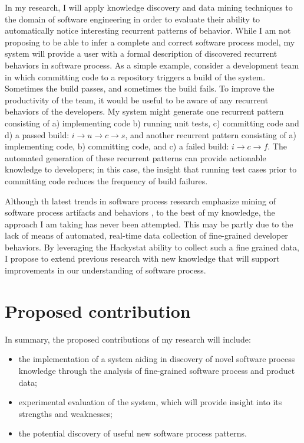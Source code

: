 In my research, I will apply knowledge discovery and data mining techniques to the domain of software engineering in order to evaluate their ability to automatically notice interesting recurrent patterns of behavior. While I am not proposing to be able to infer a complete and correct software process model, my system will provide a user with a formal description of discovered recurrent behaviors in software process. As a simple example, consider a development team in which committing code to a repository triggers a build of the system. Sometimes the build passes, and sometimes the build fails. To improve the productivity of the team, it would be useful to be aware of any recurrent behaviors of the developers. My system might generate one recurrent pattern consisting of a) implementing code b) running unit tests, c) committing code and d) a passed build: $i \rightarrow u \rightarrow c \rightarrow s $, and another recurrent pattern consisting of a) implementing code, b) committing code, and c) a failed build: $i \rightarrow c \rightarrow f $. The automated generation of these recurrent patterns can provide actionable knowledge to developers; in this case, the insight that running test cases prior to committing code reduces the frequency of build failures.

Although th latest trends in software process research emphasize mining of software process artifacts and behaviors \cite{citeulike:5043664} \cite{citeulike:1885717} \cite{citeulike:5112229} \cite{citeulike:1885717}, to the best of my knowledge, the approach I am taking has never been attempted. This may be partly due to the lack of means of automated, real-time data collection of fine-grained developer behaviors. By leveraging the Hackystat ability to collect such a fine grained data, I propose to extend previous research with new knowledge that will support improvements in our understanding of software process.

\section{Proposed contribution}
In summary, the proposed contributions of my research will include: 
\begin{itemize}
	\item the implementation of a system aiding in discovery of novel software process knowledge through the analysis of fine-grained software process and product data;
	\item experimental evaluation of the system, which will provide insight into its strengths and weaknesses;
	\item the potential discovery of useful new software process patterns.
\end{itemize}



